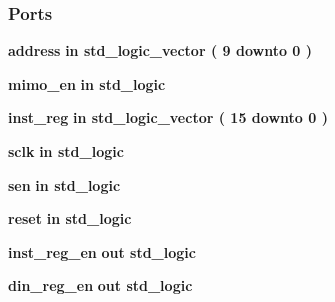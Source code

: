 \subsubsection*{Ports}
 \begin{DoxyCompactItemize}
\item 
{\bf address}  {\bfseries {\bfseries \textcolor{keywordflow}{in}\textcolor{vhdlchar}{ }}} {\bfseries \textcolor{comment}{std\+\_\+logic\+\_\+vector}\textcolor{vhdlchar}{ }\textcolor{vhdlchar}{(}\textcolor{vhdlchar}{ }\textcolor{vhdlchar}{ } \textcolor{vhdldigit}{9} \textcolor{vhdlchar}{ }\textcolor{keywordflow}{downto}\textcolor{vhdlchar}{ }\textcolor{vhdlchar}{ } \textcolor{vhdldigit}{0} \textcolor{vhdlchar}{ }\textcolor{vhdlchar}{)}\textcolor{vhdlchar}{ }} 
\item 
{\bf mimo\+\_\+en}  {\bfseries {\bfseries \textcolor{keywordflow}{in}\textcolor{vhdlchar}{ }}} {\bfseries \textcolor{comment}{std\+\_\+logic}\textcolor{vhdlchar}{ }} 
\item 
{\bf inst\+\_\+reg}  {\bfseries {\bfseries \textcolor{keywordflow}{in}\textcolor{vhdlchar}{ }}} {\bfseries \textcolor{comment}{std\+\_\+logic\+\_\+vector}\textcolor{vhdlchar}{ }\textcolor{vhdlchar}{(}\textcolor{vhdlchar}{ }\textcolor{vhdlchar}{ } \textcolor{vhdldigit}{15} \textcolor{vhdlchar}{ }\textcolor{keywordflow}{downto}\textcolor{vhdlchar}{ }\textcolor{vhdlchar}{ } \textcolor{vhdldigit}{0} \textcolor{vhdlchar}{ }\textcolor{vhdlchar}{)}\textcolor{vhdlchar}{ }} 
\item 
{\bf sclk}  {\bfseries {\bfseries \textcolor{keywordflow}{in}\textcolor{vhdlchar}{ }}} {\bfseries \textcolor{comment}{std\+\_\+logic}\textcolor{vhdlchar}{ }} 
\item 
{\bf sen}  {\bfseries {\bfseries \textcolor{keywordflow}{in}\textcolor{vhdlchar}{ }}} {\bfseries \textcolor{comment}{std\+\_\+logic}\textcolor{vhdlchar}{ }} 
\item 
{\bf reset}  {\bfseries {\bfseries \textcolor{keywordflow}{in}\textcolor{vhdlchar}{ }}} {\bfseries \textcolor{comment}{std\+\_\+logic}\textcolor{vhdlchar}{ }} 
\item 
{\bf inst\+\_\+reg\+\_\+en}  {\bfseries {\bfseries \textcolor{keywordflow}{out}\textcolor{vhdlchar}{ }}} {\bfseries \textcolor{comment}{std\+\_\+logic}\textcolor{vhdlchar}{ }} 
\item 
{\bf din\+\_\+reg\+\_\+en}  {\bfseries {\bfseries \textcolor{keywordflow}{out}\textcolor{vhdlchar}{ }}} {\bfseries \textcolor{comment}{std\+\_\+logic}\textcolor{vhdlchar}{ }} 
\item 

\end{DoxyCompactItemize}
